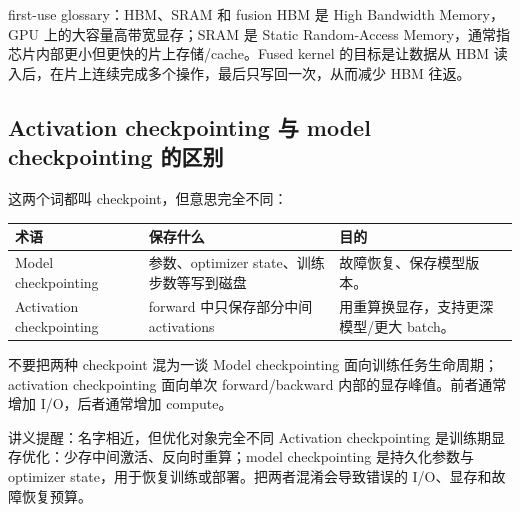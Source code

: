 \begin{knowledgebox}{first-use glossary：HBM、SRAM 和 fusion}
HBM 是 High Bandwidth Memory，GPU 上的大容量高带宽显存；SRAM 是 Static Random-Access Memory，通常指芯片内部更小但更快的片上存储/cache。Fused kernel 的目标是让数据从 HBM 读入后，在片上连续完成多个操作，最后只写回一次，从而减少 HBM 往返。
\end{knowledgebox}

\subsection{Activation checkpointing 与 model checkpointing 的区别}

这两个词都叫 checkpoint，但意思完全不同：

\begin{longtable}{p{}p{}p{}}
\toprule
\textbf{术语} & \textbf{保存什么} & \textbf{目的} \\
\midrule
Model checkpointing & 参数、optimizer state、训练步数等写到磁盘 & 故障恢复、保存模型版本。 \\
Activation checkpointing & forward 中只保存部分中间 activations & 用重算换显存，支持更深模型/更大 batch。 \\
\bottomrule
\end{longtable}

\begin{warningbox}{不要把两种 checkpoint 混为一谈}
Model checkpointing 面向训练任务生命周期；activation checkpointing 面向单次 forward/backward 内部的显存峰值。前者通常增加 I/O，后者通常增加 compute。
\end{warningbox}

\begin{knowledgebox}{讲义提醒：名字相近，但优化对象完全不同}
Activation checkpointing 是训练期显存优化：少存中间激活、反向时重算；model checkpointing 是持久化参数与 optimizer state，用于恢复训练或部署。把两者混淆会导致错误的 I/O、显存和故障恢复预算。
\end{knowledgebox}

